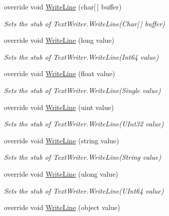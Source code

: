 \begin{DoxyCompactItemize}
override void \hyperlink{class_system_1_1_i_o_1_1_fakes_1_1_stub_string_writer_a8c65c96af1cdea77c41fd03a46a5ede4}{Write\-Line} (char\mbox{[}$\,$\mbox{]} buffer)
\begin{DoxyCompactList}\small\item\em Sets the stub of Text\-Writer.\-Write\-Line(\-Char\mbox{[}$\,$\mbox{]} buffer)\end{DoxyCompactList}\item 
override void \hyperlink{class_system_1_1_i_o_1_1_fakes_1_1_stub_string_writer_a62ec8b0cc7b490dec41df128f18e33d9}{Write\-Line} (long value)
\begin{DoxyCompactList}\small\item\em Sets the stub of Text\-Writer.\-Write\-Line(\-Int64 value)\end{DoxyCompactList}\item 
override void \hyperlink{class_system_1_1_i_o_1_1_fakes_1_1_stub_string_writer_a1f9e531c84a6ee077fd9f94b12cdcd98}{Write\-Line} (float value)
\begin{DoxyCompactList}\small\item\em Sets the stub of Text\-Writer.\-Write\-Line(\-Single value)\end{DoxyCompactList}\item 
override void \hyperlink{class_system_1_1_i_o_1_1_fakes_1_1_stub_string_writer_a7841f2664fd36608249e282b29356073}{Write\-Line} (uint value)
\begin{DoxyCompactList}\small\item\em Sets the stub of Text\-Writer.\-Write\-Line(\-U\-Int32 value)\end{DoxyCompactList}\item 
override void \hyperlink{class_system_1_1_i_o_1_1_fakes_1_1_stub_string_writer_a2dea5aeacc5ec99400777adefee50055}{Write\-Line} (string value)
\begin{DoxyCompactList}\small\item\em Sets the stub of Text\-Writer.\-Write\-Line(\-String value)\end{DoxyCompactList}\item 
override void \hyperlink{class_system_1_1_i_o_1_1_fakes_1_1_stub_string_writer_a3b83e3ba569c09935ac8d50be382b2ac}{Write\-Line} (ulong value)
\begin{DoxyCompactList}\small\item\em Sets the stub of Text\-Writer.\-Write\-Line(\-U\-Int64 value)\end{DoxyCompactList}\item 
override void \hyperlink{class_system_1_1_i_o_1_1_fakes_1_1_stub_string_writer_a7ffa231296d759d0f45dc2ac5b40ccd1}{Write\-Line} (object value)

\end{DoxyCompactItemize}
